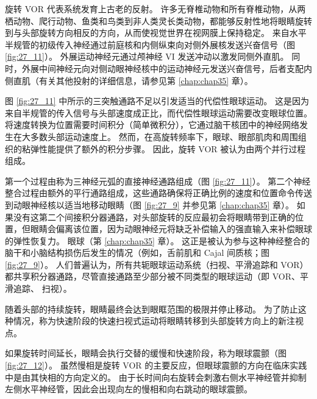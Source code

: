旋转 VOR 代表系统发育上古老的反射。
许多无脊椎动物和所有脊椎动物，从两栖动物、爬行动物、鱼类和鸟类到非人类灵长类动物，都能够反射性地将眼睛旋转到与头部旋转方向相反的方向，从而使视觉世界在视网膜上保持稳定。
来自水平半规管的初级传入神经通过前庭核和内侧纵束向对侧外展核发送兴奋信号（图 \ref{fig:27_11}）。 外展运动神经元通过颅神经 VI 发送冲动以激发同侧外直肌。
同时，外展中间神经元向对侧动眼神经核中的运动神经元发送兴奋信号，后者支配内侧直肌（有关其他投射的详细信息，请参见第 \ref{chap:chap35} 章）。


图 \ref{fig:27_11} 中所示的三突触通路不足以引发适当的代偿性眼球运动。
这是因为来自半规管的传入信号与头部速度成正比，而代偿性眼球运动需要改变眼球位置。
将速度转换为位置需要时间积分（简单微积分），它通过脑干核团中的神经网络发生在大多数头部运动速度上。
然而，在高旋转频率下，眼球、眼部肌肉和周围组织的粘弹性能提供了额外的积分步骤。
因此，旋转 VOR 被认为由两个并行过程组成。


第一个过程由称为三神经元弧的直接神经通路组成（图 \ref{fig:27_11}）。
第二个神经整合过程由额外的平行通路组成，这些通路确保将正确比例的速度和位置命令传送到动眼神经核以适当地移动眼睛（图 \ref{fig:27_9} 并参见第 \ref{chap:chap35} 章）。
如果没有这第二个间接积分器通路，对头部旋转的反应最初会将眼睛带到正确的位置，但眼睛会偏离该位置，因为动眼神经元将缺乏补偿输入的强直输入来补偿眼球的弹性恢复力。
眼球（第 \ref{chap:chap35} 章）。
这正是被认为参与这种神经整合的脑干和小脑结构损伤后发生的情况（例如，舌前肌和 Cajal 间质核；图 \ref{fig:27_9}）。
人们普遍认为，所有共轭眼球运动系统（扫视、平滑追踪和 VOR）都共享积分器通路，尽管直接通路至少部分被不同类型的眼球运动（即 VOR、平滑追踪、 扫视）。


随着头部的持续旋转，眼睛最终会达到眼眶范围的极限并停止移动。
为了防止这种情况，称为快速阶段的快速扫视式运动将眼睛转移到头部旋转方向上的新注视点。


如果旋转时间延长，眼睛会执行交替的缓慢和快速阶段，称为眼球震颤（图 \ref{fig:27_12}）。
虽然慢相是旋转 VOR 的主要反应，但眼球震颤的方向在临床实践中是由其快相的方向定义的。
由于长时间向右旋转会刺激右侧水平神经管并抑制左侧水平神经管，因此会出现向左的慢相和向右跳动的眼球震颤。


